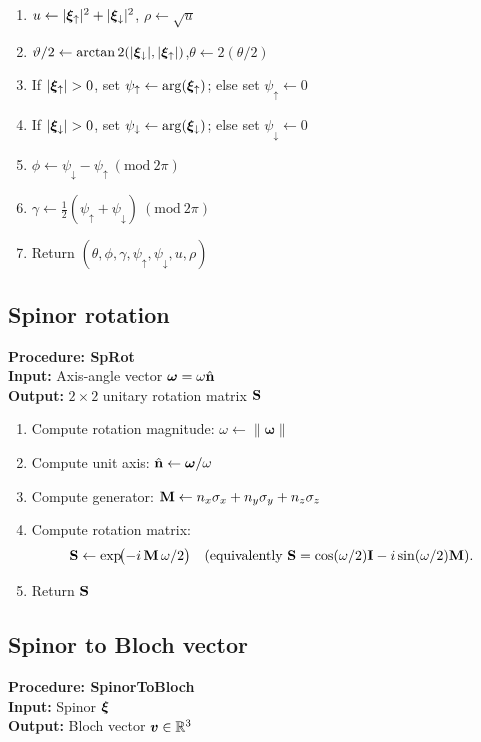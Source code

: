 \begin{enumerate}
\item $u \gets |\bm{\xi}_\uparrow|^2+|\bm{\xi}_\downarrow|^2$, \qquad $\rho \gets \sqrt{u}$
\item $\vartheta/2 \gets \arctan2(|\bm{\xi}_\downarrow|,|\bm{\xi}_\uparrow|)$,\qquad $\theta \gets 2(\theta/2)$
\item If $|\spu|>0$, set $\psi_\uparrow\gets \arg(\bm{\xi}_\uparrow)$; else set $\psi_\uparrow\gets 0$
\item If $|\spd|>0$, set $\psi_\downarrow\gets \arg(\bm{\xi}_\downarrow)$; else set $\psi_\downarrow\gets 0$
\item $\phi \gets \psi_\downarrow-\psi_\uparrow \ (\mathrm{mod}\ 2\pi)$
\item $\gamma \gets \tfrac12(\psi_\uparrow+\psi_\downarrow)\ (\mathrm{mod}\ 2\pi)$
\item Return $(\theta,\phi,\gamma,\psi_\uparrow,\psi_\downarrow,u,\rho)$
\end{enumerate}

\subsection{Spinor rotation}

\medskip
\noindent\textbf{Procedure: SpRot}\\
\textbf{Input:} Axis-angle vector $\boldsymbol{\omega} = \omega \hat{\mathbf{n}}$\\
\textbf{Output:} $2\times 2$ unitary rotation matrix $\mathbf{S}$

\begin{enumerate}
\item Compute rotation magnitude: $\omega \gets \|\boldsymbol{\omega}\|$
\item Compute unit axis: $\hat{\mathbf{n}} \gets \boldsymbol{\omega}/\omega$
\item Compute generator: $\mathbf{M} \gets n_x {\sigma}_x + n_y {\sigma}_y + n_z {\sigma}_z$
\item Compute rotation matrix:
\[
\mathbf{S} \gets \exp\!\bigl(-i\,\mathbf{M}\,\omega/2\bigr)
\quad\text{(equivalently } \mathbf{S}=\cos(\omega/2)\mathbf{I}-i\sin(\omega/2)\mathbf{M}\text{)}.
\]
\item Return $\mathbf{S}$
\end{enumerate}

\subsection{Spinor to Bloch vector}

\medskip
\noindent\textbf{Procedure: SpinorToBloch}\\
\textbf{Input:} Spinor $\bm{\xi}$\\
\textbf{Output:} Bloch vector $\bm{v} \in \mathbb{R}^3$

